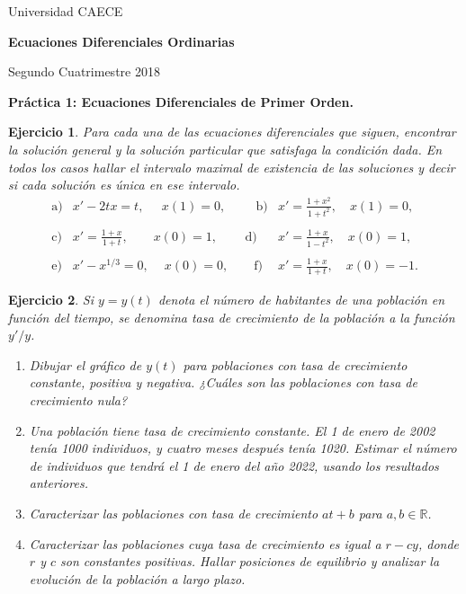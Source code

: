 \documentclass[11pt,a4paper,pdftex]{amsart}
\newtheorem{ej}{Ejercicio}%
\numberwithin{equation}{section}%
\newcommand{\bej}[1]{\begin{ej}\rm{#1}}
\newcommand{\eej}{\end{ej}\vspace{-0.2cm}}
\renewcommand{\bf}{\textbf}
\newcommand{\di}{\displaystyle}
\newcommand{\R}{\mathbb R}
\newcommand{\0}{\mathbb O}
\newcommand{\8}{\infty}
\begin{document}

\centerline{{\small Universidad CAECE}}

 \vskip 0.2cm
 \hrulefill
 \vskip 0.2cm

 \centerline{{\bf{\Large{\sc Ecuaciones Diferenciales Ordinarias}}}}
 \vskip 0.2cm
 \centerline{\ttfamily Segundo Cuatrimestre 2018}
 \hrulefill

 \medskip
 \centerline{\bf {Práctica 1: Ecuaciones Diferenciales de Primer Orden.}}
 \medskip


\bej Para cada una de las ecuaciones diferenciales que siguen, encontrar la 
solución general y la soluci\'on  particular que satisfaga la condici\'on 
dada. En todos los casos hallar el intervalo maximal de existencia de las 
soluciones y decir si cada solución es única en ese intervalo. 
\[
\begin{array}{llll}
\mbox{a)}&x'-2tx=t,\ \, \quad x(1)=0,\qquad
\ \, \mbox{b)}&x'=\di\frac{1+x^2}{1+t^2},\quad x(1)=0,\\
\\
\mbox{c)}&x'=\di
\frac{1+x}{1+t}, \qquad x(0)=1,\qquad
\,\mbox{d)}&x'=\di\frac{1+x}{1-t^2}, \quad x(0)=1, \\
\\
\mbox{e)} &x'-x^{1/3}=0,\ \quad x(0)=0, \qquad
\mbox{f)}&x'=\di\frac{1+x}{1+t}, \quad x(0)=-1.
\end{array}
\]

\eej

\bigskip
\bej Si $y=y(t)$ denota el n\'umero de habitantes de una poblaci\'on en 
funci\'on del tiempo, se denomina tasa de cre\-ci\-miento de la poblaci\'on a 
la funci\'on $y'/y$.

\begin{enumerate}
\item[(a)] Dibujar el gr\'afico de $y(t)$ para poblaciones con tasa de
crecimiento cons\-tante, positiva y negativa. ¿Cu\'ales son las poblaciones 
con tasa de crecimiento nula?

\item[(b)] Una población tiene tasa de crecimiento constante. El 1 de
enero de 2002 tenía 1000 individuos, y cuatro meses despu\'es
tenía 1020. Estimar el número de individuos que tendr\'a el
1 de enero del año 2022, usando los resultados anteriores.

\item[(e)] Caracterizar las poblaciones con tasa de crecimiento $at + b$ para
$a,b \in \R$.

\item[(f)] Caracterizar las poblaciones cuya tasa de crecimiento es
igual a $r-cy$, donde $r$ y $c$ son constantes positivas. Hallar posiciones
de equilibrio y analizar la evolución de la población a largo plazo.
\end{enumerate}
\eej
\end{document}
